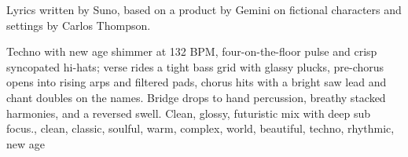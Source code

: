 

\begin{notes}
Lyrics written by Suno, based on a product by Gemini on fictional characters and settings by Carlos Thompson.
\end{notes}

\begin{style}
Techno with new age shimmer at 132 BPM, four-on-the-floor pulse and crisp syncopated hi-hats; verse rides a tight bass grid with glassy plucks, pre-chorus opens into rising arps and filtered pads, chorus hits with a bright saw lead and chant doubles on the names. %
Bridge drops to hand percussion, breathy stacked harmonies, and a reversed swell. %
Clean, glossy, futuristic mix with deep sub focus., clean, classic, soulful, warm, complex, world, beautiful, techno, rhythmic, new age
\end{style}

